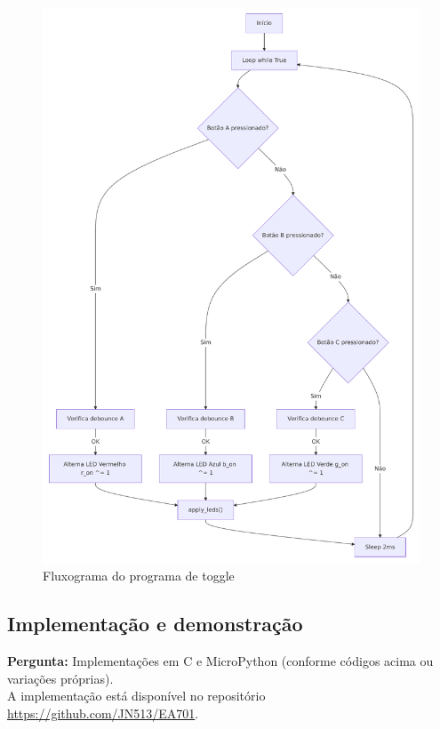 \documentclass{article}
\begin{document}
\begin{figure}
    \centering
    \includegraphics[width=\linewidth]{diagrama.pdf}
    \caption{Fluxograma do programa de toggle}
    \label{fig:togle}
\end{figure}

\subsection{Implementação e demonstração}
\noindent
\textbf{Pergunta:} Implementações em C e MicroPython (conforme códigos acima ou variações próprias). \\

\noindent
A implementação está disponível no repositório \href{https://github.com/JN513/EA701/tree/main/roteiro1/experimento3}{https://github.com/JN513/EA701}.\\
\end{document}
